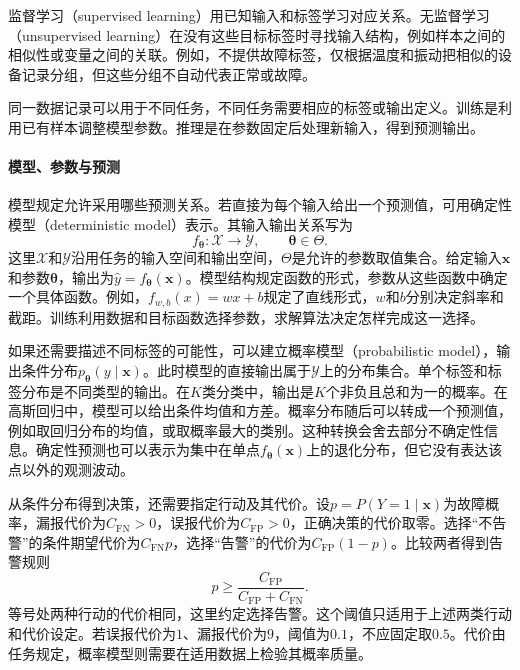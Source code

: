 监督学习（supervised learning）用已知输入和标签学习对应关系。无监督学习（unsupervised learning）在没有这些目标标签时寻找输入结构，例如样本之间的相似性或变量之间的关联。例如，不提供故障标签，仅根据温度和振动把相似的设备记录分组，但这些分组不自动代表正常或故障。

同一数据记录可以用于不同任务，不同任务需要相应的标签或输出定义。训练是利用已有样本调整模型参数。推理是在参数固定后处理新输入，得到预测输出。


\paragraph{模型、参数与预测}
模型规定允许采用哪些预测关系。若直接为每个输入给出一个预测值，可用确定性模型（deterministic model）表示。其输入输出关系写为
\begin{equation}
 f_{\bm{\theta}}:\mathcal{X}\rightarrow\mathcal{Y},
 \qquad \bm{\theta}\in\Theta.
\end{equation}
这里$\mathcal X$和$\mathcal Y$沿用任务的输入空间和输出空间，$\Theta$是允许的参数取值集合。给定输入$\bm{x}$和参数$\bm\theta$，输出为$\hat y=f_{\bm\theta}(\bm x)$。模型结构规定函数的形式，参数从这些函数中确定一个具体函数。例如，$f_{w,b}(x)=wx+b$规定了直线形式，$w$和$b$分别决定斜率和截距。训练利用数据和目标函数选择参数，求解算法决定怎样完成这一选择。

如果还需要描述不同标签的可能性，可以建立概率模型（probabilistic model），输出条件分布$p_{\bm\theta}(y\mid\bm x)$。此时模型的直接输出属于$\mathcal Y$上的分布集合。单个标签和标签分布是不同类型的输出。在$K$类分类中，输出是$K$个非负且总和为一的概率。在高斯回归中，模型可以给出条件均值和方差。概率分布随后可以转成一个预测值，例如取回归分布的均值，或取概率最大的类别。这种转换会舍去部分不确定性信息。确定性预测也可以表示为集中在单点$f_{\bm\theta}(\bm x)$上的退化分布，但它没有表达该点以外的观测波动。

从条件分布得到决策，还需要指定行动及其代价。设$p=P(Y=1\mid\bm x)$为故障概率，漏报代价为$C_{\mathrm{FN}}>0$，误报代价为$C_{\mathrm{FP}}>0$，正确决策的代价取零。选择“不告警”的条件期望代价为$C_{\mathrm{FN}}p$，选择“告警”的代价为$C_{\mathrm{FP}}(1-p)$。比较两者得到告警规则
\begin{equation}
 p\geq\frac{C_{\mathrm{FP}}}{C_{\mathrm{FP}}+C_{\mathrm{FN}}}.
\end{equation}
等号处两种行动的代价相同，这里约定选择告警。这个阈值只适用于上述两类行动和代价设定。若误报代价为$1$、漏报代价为$9$，阈值为$0.1$，不应固定取$0.5$。代价由任务规定，概率模型则需要在适用数据上检验其概率质量。

